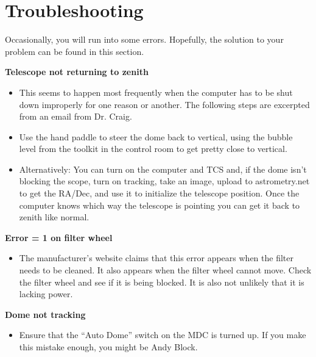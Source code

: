 \documentclass[letterpaper, 12pt]{report}
\begin{document}
\chapter{Troubleshooting}
Occasionally, you will run into some errors. Hopefully, the solution to your problem can be found in this section.

\textbf{Telescope not returning to zenith}
\begin{itemize}
	\item This seems to happen most frequently when the computer has to be shut down improperly for one reason or another. The following steps are excerpted from an email from Dr. Craig.
	\item Use the hand paddle to steer the dome back to vertical, using the bubble level from the toolkit in the control room to get pretty close to vertical.
	\item Alternatively: You can turn on the computer and TCS and, if the dome isn’t blocking the scope, turn on tracking, take an image, upload to astrometry.net to get the RA/Dec, and use it to initialize the telescope position. Once the computer knows which way the telescope is pointing you can get it back to zenith like normal.
\end{itemize}
\textbf{Error = 1 on filter wheel}
\begin{itemize}
	\item The manufacturer's website claims that this error appears when the filter needs to be cleaned. It also appears when the filter wheel cannot move. Check the filter wheel and see if it is being blocked. It is also not unlikely that it is lacking power.
\end{itemize}
\textbf{Dome not tracking}
\begin{itemize}
	\item Ensure that the ``Auto Dome'' switch on the MDC is turned up. If you make this mistake enough, you might be Andy Block.
\end{itemize}
\end{document}
